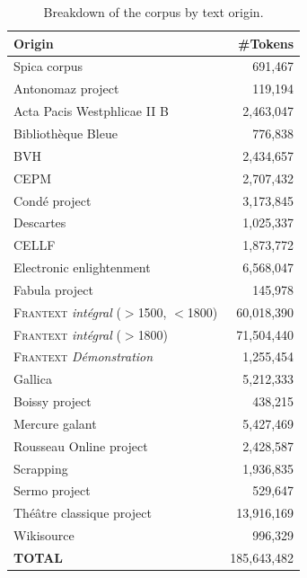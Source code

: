 \begin{table}[htp]
    \centering
    \begin{tabular}{lr}
        \toprule
        Origin                                                 & \#Tokens    \\
        \midrule
        Spica corpus                                           & 691,467     \\
        Antonomaz project                                      & 119,194     \\
        Acta Pacis Westphlicae II B                            & 2,463,047   \\
        Bibliothèque Bleue                                     & 776,838     \\
        BVH                                                    & 2,434,657   \\
        CEPM                                                   & 2,707,432   \\
        Condé project                                          & 3,173,845   \\
        Descartes                                              & 1,025,337   \\
        CELLF                                                  & 1,873,772   \\
        Electronic enlightenment                               & 6,568,047   \\
        Fabula project                                         & 145,978     \\
        \textsc{Frantext} \textit{intégral} ($>$1500, $<$1800) & 60,018,390  \\
        \textsc{Frantext} \textit{intégral} ($>$1800)          & 71,504,440  \\
        \textsc{Frantext} \textit{Démonstration}               & 1,255,454   \\
        Gallica                                                & 5,212,333   \\
        Boissy project                                         & 438,215     \\
        Mercure galant                                         & 5,427,469   \\
        Rousseau Online project                                & 2,428,587   \\
        Scrapping                                              & 1,936,835   \\
        Sermo project                                          & 529,647     \\
        Théâtre classique project                              & 13,916,169  \\
        Wikisource                                             & 996,329     \\
        \midrule
        \textbf{TOTAL}                                         & 185,643,482 \\
        \bottomrule
    \end{tabular}
    \caption{Breakdown of the \freemmax corpus by text origin.}
    \label{tab:my_label}
\end{table}

